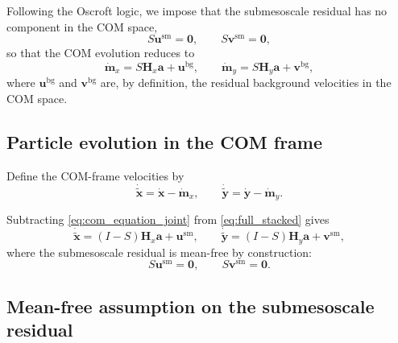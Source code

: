 \documentclass{article}
\begin{document}
Following the Oscroft logic, we impose that the submesoscale residual has no component
in the COM space,
\begin{equation}
S\mathbf{u}^{\mathrm{sm}}=\mathbf{0},
\qquad
S\mathbf{v}^{\mathrm{sm}}=\mathbf{0},
\label{eq:sm_zero_mean}
\end{equation}
so that the COM evolution reduces to
\begin{equation}
\dot{\mathbf{m}}_x
=
S\mathbf{H}_x\mathbf{a}
+
\mathbf{u}^{\mathrm{bg}},
\qquad
\dot{\mathbf{m}}_y
=
S\mathbf{H}_y\mathbf{a}
+
\mathbf{v}^{\mathrm{bg}},
\label{eq:com_equation_joint}
\end{equation}
where \(\mathbf{u}^{\mathrm{bg}}\) and \(\mathbf{v}^{\mathrm{bg}}\) are, by definition,
the residual background velocities in the COM space.

\subsection{Particle evolution in the COM frame}

Define the COM-frame velocities by
\begin{equation}
\dot{\tilde{\mathbf{x}}}=\dot{\mathbf{x}}-\dot{\mathbf{m}}_x,
\qquad
\dot{\tilde{\mathbf{y}}}=\dot{\mathbf{y}}-\dot{\mathbf{m}}_y.
\label{eq:tilde_vels}
\end{equation}

Subtracting \eqref{eq:com_equation_joint} from \eqref{eq:full_stacked} gives
\begin{equation}
\dot{\tilde{\mathbf{x}}}
=
(I-S)\mathbf{H}_x\mathbf{a}
+
\mathbf{u}^{\mathrm{sm}},
\qquad
\dot{\tilde{\mathbf{y}}}
=
(I-S)\mathbf{H}_y\mathbf{a}
+
\mathbf{v}^{\mathrm{sm}},
\label{eq:relative_equation_joint}
\end{equation}
where the submesoscale residual is mean-free by construction:
\begin{equation}
S\mathbf{u}^{\mathrm{sm}}=\mathbf{0},
\qquad
S\mathbf{v}^{\mathrm{sm}}=\mathbf{0}.
\end{equation}

\subsection{Mean-free assumption on the submesoscale residual}
\end{document}
